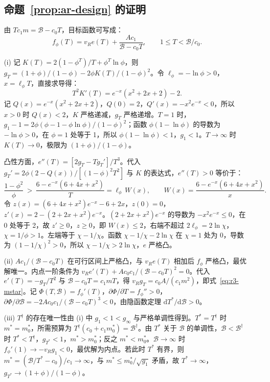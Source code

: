 \subsection{\texorpdfstring{命题~\ref{prop:ar-design} 的证明}{命题 7 的证明}}

由 $Tc_1m=\mathcal B-c_0T$，目标函数可写成：
\begin{equation}
  f_\phi(T)=v_Re(T)+\frac{Ac_1}{\mathcal B-c_0T},\qquad 1\leq T<\mathcal B/c_0 .
\end{equation}

(i) 记 $K(T)=2(1-\phi^T)/T+\phi^T\ln\phi$，则 $g_T=(1+\phi)/(1-\phi)-2\phi K(T)/(1-\phi)^2$。令 $\ell_\phi=-\ln\phi>0$，$x=\ell_\phi T$，直接求导得：
\begin{equation}
  T^2K'(T)=e^{-x}(x^2+2x+2)-2 .
\end{equation}
记 $Q(x)=e^{-x}(x^2+2x+2)$，$Q(0)=2$，$Q'(x)=-x^2e^{-x}<0$，所以 $x>0$ 时 $Q(x)<2$，$K$ 严格递减，$g_T$ 严格递增。$T=1$ 时，$g_1-1=2\phi(\phi-1-\phi\ln\phi)/(1-\phi)^2$；函数 $\phi(1-\ln\phi)$ 的导数为 $-\ln\phi>0$，在 $\phi=1$ 处等于 1，所以 $\phi(1-\ln\phi)<1$，$g_1<1$。$T\to\infty$ 时 $K(T)\to0$，极限为 $(1+\phi)/(1-\phi)$。

凸性方面，$e''(T)=[2g_T-Tg_T']/T^3$。代入 $g_T'=2\phi(2-Q(x))/[(1-\phi)^2T^2]$ 与 $K$ 的表达式，$e''(T)>0$ 等价于：
\begin{equation}
  \frac{1-\phi^2}{\phi}\ >\ \frac{6-e^{-x}(6+4x+x^2)}{T}=\ell_\phi\,W(x),\qquad W(x)=\frac{6-e^{-x}(6+4x+x^2)}{x}.
\end{equation}
令 $z(x)=(6+4x+x^2)e^{-x}-6+2x$，$z(0)=0$，$z'(x)=2-(2+2x+x^2)e^{-x}$。$(2+2x+x^2)e^{-x}$ 的导数为 $-x^2e^{-x}\leq0$，在 $0$ 处等于 2，故 $z'\geq0$，$z\geq0$，即 $W(x)\leq2$，右端不超过 $2\ell_\phi=2\ln\chi$，$\chi=1/\phi>1$。左端等于 $\chi-1/\chi$。函数 $\chi-1/\chi-2\ln\chi$ 在 $\chi=1$ 处为 0，导数为 $(1-1/\chi)^2>0$，所以 $\chi-1/\chi>2\ln\chi$，$e$ 严格凸。

(ii) $Ac_1/(\mathcal B-c_0T)$ 在可行区间上严格凸，与 $v_Re(T)$ 相加后 $f_\phi$ 严格凸，最优解唯一。内点一阶条件为 $v_Re'(T)+Ac_0c_1/(\mathcal B-c_0T)^2=0$。代入 $e'(T)=-g_T/T^2$ 与 $\mathcal B-c_0T=c_1mT$，得 $v_Rg_T=c_0A/(c_1m^2)$，即式~\eqref{eq:r3-mstar}。记 $\Phi(T,\mathcal B)=f_\phi'(T)$，$\partial\Phi/\partial T=f_\phi''>0$，$\partial\Phi/\partial\mathcal B=-2Ac_0c_1/(\mathcal B-c_0T)^3<0$，由隐函数定理 $\mathrm dT^*/\mathrm d\mathcal B>0$。

(iii) $T^\dagger$ 的存在唯一性由 (i) 中 $g_1<1<g_\infty$ 与严格单调性得到。$T^*=T^\dagger$ 时 $m^*=m_0^*$，所需预算为 $T^\dagger(c_0+c_1m_0^*)=\mathcal B^\dagger$。由 $T^*$ 关于 $\mathcal B$ 的单调性，$\mathcal B<\mathcal B^\dagger$ 时 $T^*<T^\dagger$，$g_{T^*}<1$，$m^*>m_0^*$；反之 $m^*<m_0^*$。$\mathcal B\to\infty$ 时 $f_\phi'(1)\to-v_Rg_1<0$，最优解为内点。若此时 $T^*$ 有界，则 $m^*=(\mathcal B/T^*-c_0)/c_1\to\infty$，与 $m^*\leq m_0^*/\sqrt{g_1}$ 矛盾，故 $T^*\to\infty$，$g_{T^*}\to(1+\phi)/(1-\phi)$。


